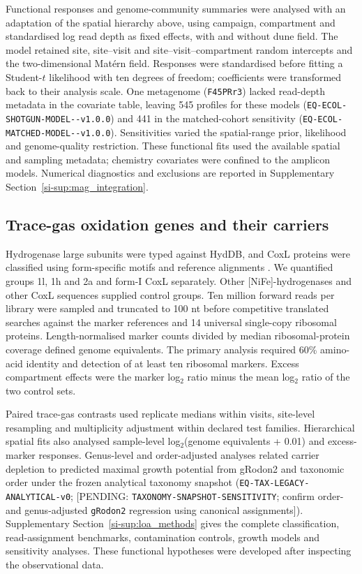 Functional responses and genome-community summaries were analysed with an adaptation of the spatial hierarchy above, using campaign, compartment and standardised log read depth as fixed effects, with and without dune field. The model retained site, site--visit and site--visit--compartment random intercepts and the two-dimensional Mat\'ern field. Responses were standardised before fitting a Student-$t$ likelihood with ten degrees of freedom; coefficients were transformed back to their analysis scale. One metagenome (\texttt{F45PRr3}) lacked read-depth metadata in the covariate table, leaving 545 profiles for these models (\texttt{EQ-ECOL-\allowbreak SHOTGUN-\allowbreak MODEL--\allowbreak v1.0.0}) and 441 in the matched-cohort sensitivity (\texttt{EQ-ECOL-\allowbreak MATCHED-\allowbreak MODEL--\allowbreak v1.0.0}). Sensitivities varied the spatial-range prior, likelihood and genome-quality restriction. These functional fits used the available spatial and sampling metadata; chemistry covariates were confined to the amplicon models. Numerical diagnostics and exclusions are reported in Supplementary Section~\ref{si-sup:mag_integration}.

\subsection*{Trace-gas oxidation genes and their carriers}

Hydrogenase large subunits were typed against HydDB, and CoxL proteins were classified using form-specific motifs and reference alignments \cite{sondergaard2016hyddb,cordero2019atmospheric}. We quantified groups 1l, 1h and 2a and form-I CoxL separately. Other [NiFe]-hydrogenases and other CoxL sequences supplied control groups. Ten million forward reads per library were sampled and truncated to 100 nt before competitive translated searches against the marker references and 14 universal single-copy ribosomal proteins. Length-normalised marker counts divided by median ribosomal-protein coverage defined genome equivalents. The primary analysis required 60\% amino-acid identity and detection of at least ten ribosomal markers. Excess compartment effects were the marker log$_2$ ratio minus the mean log$_2$ ratio of the two control sets.

Paired trace-gas contrasts used replicate medians within visits, site-level resampling and multiplicity adjustment within declared test families. Hierarchical spatial fits also analysed sample-level log$_2$(genome equivalents + 0.01) and excess-marker responses. Genus-level and order-adjusted analyses related carrier depletion to predicted maximal growth potential from gRodon2 and taxonomic order \cite{weissman2021grodon} under the frozen analytical taxonomy snapshot (\texttt{EQ-TAX-\allowbreak LEGACY-\allowbreak ANALYTICAL-\allowbreak v0}; [PENDING: \texttt{TAXONOMY-\allowbreak SNAPSHOT-\allowbreak SENSITIVITY}; confirm order- and genus-adjusted \texttt{gRodon2} regression using canonical assignments]). Supplementary Section~\ref{si-sup:loa_methods} gives the complete classification, read-assignment benchmarks, contamination controls, growth models and sensitivity analyses. These functional hypotheses were developed after inspecting the observational data.

